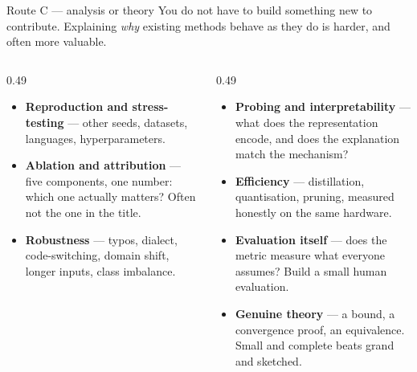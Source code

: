 \documentclass[aspectratio=169,11pt]{beamer}
\newcommand{\key}[1]{\textbf{\color{brand}#1}}
\begin{document}
\begin{frame}{Route C --- analysis or theory}
You do not have to build something new to contribute. Explaining \emph{why}
existing methods behave as they do is harder, and often more valuable.

\vspace{3mm}
\begin{columns}[T]
\begin{column}{0.49\textwidth}
\footnotesize
\begin{itemize}
  \item \key{Reproduction and stress-testing} --- other seeds, datasets,
        languages, hyperparameters.
  \item \key{Ablation and attribution} --- five components, one number: which
        one actually matters? Often not the one in the title.
  \item \key{Robustness} --- typos, dialect, code-switching, domain shift,
        longer inputs, class imbalance.
\end{itemize}
\end{column}
\begin{column}{0.49\textwidth}
\footnotesize
\begin{itemize}
  \item \key{Probing and interpretability} --- what does the representation
        encode, and does the explanation match the mechanism?
  \item \key{Efficiency} --- distillation, quantisation, pruning, measured
        honestly on the same hardware.
  \item \key{Evaluation itself} --- does the metric measure what everyone
        assumes? Build a small human evaluation.
  \item \key{Genuine theory} --- a bound, a convergence proof, an equivalence.
        Small and complete beats grand and sketched.
\end{itemize}
\end{column}
\end{columns}
\end{frame}
\end{document}
